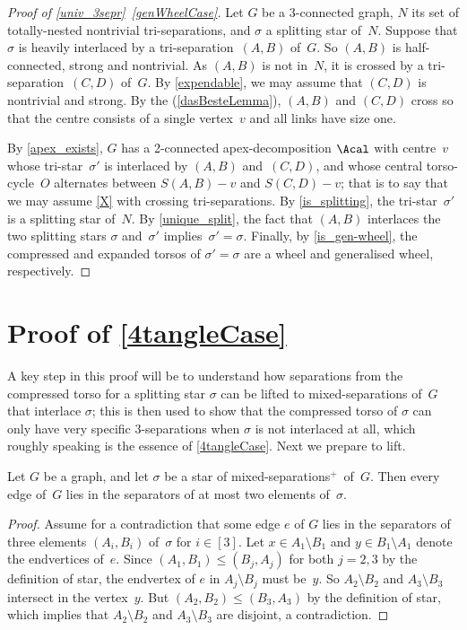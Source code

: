 \documentclass{aic}
\theoremstyle{plain}
\theoremstyle{definition}
\theoremstyle{plain}
\newcommand{\plus}{${}^+$}
\theoremstyle{plain}
\newcommand{\sm}{\setminus}
\renewcommand{\le}{\leqslant}
\begin{document}
\begin{proof}[Proof of \autoref{univ_3sepr}~\textnormal{\ref{genWheelCase}}]
Let $G$ be a 3-connected graph, $N$ its set of totally-nested nontrivial tri-separations, and $\sigma$ a splitting star of~$N$.
Suppose that $\sigma$ is heavily interlaced by a tri-separation~$(A,B)$ of~$G$.
So $(A,B)$ is half-connected, strong and nontrivial.
As $(A,B)$ is not in~$N$, it is crossed by a tri-separation~$(C,D)$ of~$G$.
By \autoref{expendable}, we may assume that $(C,D)$ is nontrivial and strong.
By the  (\ref{dasBesteLemma}), $(A,B)$ and $(C,D)$ cross so that the centre consists of a single vertex~$v$ and all links have size one.

By \autoref{apex_exists}, $G$ has a 2-connected apex-decomposition $\Acal$ with centre~$v$ whose tri-star~$\sigma'$ is interlaced by $(A,B)$ and~$(C,D)$, and whose central torso-cycle~$O$ alternates between $S(A,B)-v$ and $S(C,D)-v$; that is to say that we may assume \autoref{X} with crossing tri-separations.
By \autoref{is_splitting}, the tri-star~$\sigma'$ is a splitting star of~$N$. 
By \autoref{unique_split}, the fact that $(A,B)$ interlaces the two splitting stars $\sigma$ and~$\sigma'$ implies~$\sigma'=\sigma$.
Finally, by \autoref{is_gen-wheel}, the compressed and expanded torsos of $\sigma'=\sigma$ are a wheel and generalised wheel, respectively.
\end{proof}



\section[Proof of (iii)]{Proof of \ref{4tangleCase}}

A key step in this proof will be to understand how separations from the compressed torso for a splitting star $\sigma$ can be lifted to mixed-separations of~$G$ that interlace $\sigma$; this is then used to show that the compressed torso of $\sigma$ can only have very specific 3-separations when $\sigma$ is not interlaced at all, which roughly speaking is the essence of \ref{4tangleCase}. Next we prepare to lift.

\begin{lem}\label{edgeInAtMostTwoSeparators}
Let $G$ be a graph, and let $\sigma$ be a star of mixed-separations\plus\ of~$G$.
Then every edge of~$G$ lies in the separators of at most two elements of~$\sigma$.
\end{lem}
\begin{proof}
Assume for a contradiction that some edge $e$ of $G$ lies in the separators of three elements $(A_i,B_i)$ of~$\sigma$ for $i\in [3]$.
Let $x\in A_1\sm B_1$ and $y\in B_1\sm A_1$ denote the endvertices of~$e$.
Since $(A_1,B_1)\le (B_j,A_j)$ for both $j=2,3$ by the definition of star, the endvertex of $e$ in $A_j\sm B_j$ must be~$y$.
So $A_2\sm B_2$ and $A_3\sm B_3$ intersect in the vertex~$y$.
But $(A_2,B_2)\le (B_3,A_3)$ by the definition of star, which implies that $A_2\sm B_2$ and $A_3\sm B_3$ are disjoint, a contradiction.
\end{proof}
\end{document}
